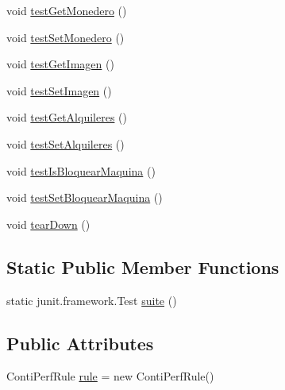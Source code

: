 \begin{DoxyCompactItemize}
\item 
void \mbox{\hyperlink{classes_1_1deusto_1_1client_1_1data_1_1_socio_test_a8873e259eb980e6f38c28bfd4a83fe02}{test\+Get\+Monedero}} ()
\item 
void \mbox{\hyperlink{classes_1_1deusto_1_1client_1_1data_1_1_socio_test_a4da6d9ccf4b895e5112a524020e31152}{test\+Set\+Monedero}} ()
\item 
void \mbox{\hyperlink{classes_1_1deusto_1_1client_1_1data_1_1_socio_test_ae059852661606ce3b98ebfa4ef6b2c52}{test\+Get\+Imagen}} ()
\item 
void \mbox{\hyperlink{classes_1_1deusto_1_1client_1_1data_1_1_socio_test_a7a797095a6d8c7fa9c3915702f2074ae}{test\+Set\+Imagen}} ()
\item 
void \mbox{\hyperlink{classes_1_1deusto_1_1client_1_1data_1_1_socio_test_a28db4d1b243d876b703babfc39bd818d}{test\+Get\+Alquileres}} ()
\item 
void \mbox{\hyperlink{classes_1_1deusto_1_1client_1_1data_1_1_socio_test_a2cd952f28429a0033bed68de1fca6d13}{test\+Set\+Alquileres}} ()
\item 
void \mbox{\hyperlink{classes_1_1deusto_1_1client_1_1data_1_1_socio_test_a927fc28f82f4375709b7663796be5068}{test\+Is\+Bloquear\+Maquina}} ()
\item 
void \mbox{\hyperlink{classes_1_1deusto_1_1client_1_1data_1_1_socio_test_a4412b573182ebd049b7be5bdf53c1c8b}{test\+Set\+Bloquear\+Maquina}} ()
\item 
void \mbox{\hyperlink{classes_1_1deusto_1_1client_1_1data_1_1_socio_test_a5b7988a01e67afbf6bbfcffd78aea509}{tear\+Down}} ()
\end{DoxyCompactItemize}
\subsection*{Static Public Member Functions}
\begin{DoxyCompactItemize}
\item 
static junit.\+framework.\+Test \mbox{\hyperlink{classes_1_1deusto_1_1client_1_1data_1_1_socio_test_abf4488a12df72d624e964f145551e9a9}{suite}} ()
\end{DoxyCompactItemize}
\subsection*{Public Attributes}
\begin{DoxyCompactItemize}
\item 
Conti\+Perf\+Rule \mbox{\hyperlink{classes_1_1deusto_1_1client_1_1data_1_1_socio_test_ac422397a4a43c86bbb36c25630706751}{rule}} = new Conti\+Perf\+Rule()
\end{DoxyCompactItemize}


